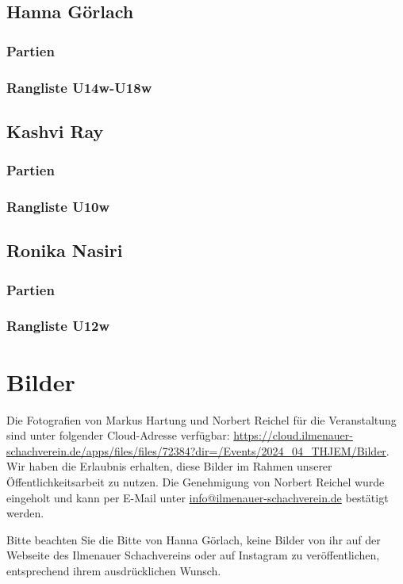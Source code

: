 \documentclass[a4paper,ngerman]{tui-algo-seminar}
\begin{document}
\subsection{Hanna Görlach}
    \subsubsection{Partien}
        
    \subsubsection{Rangliste U14w-U18w}
        
\clearpage

\subsection{Kashvi Ray}
    \subsubsection{Partien}
        
    \subsubsection{Rangliste U10w}
        
\clearpage

\subsection{Ronika Nasiri}
    \subsubsection{Partien}
        
    \subsubsection{Rangliste U12w}
        
    
\clearpage


\section{Bilder}
Die Fotografien von Markus Hartung und Norbert Reichel für die Veranstaltung sind unter folgender Cloud-Adresse verfügbar: \url{https://cloud.ilmenauer-schachverein.de/apps/files/files/72384?dir=/Events/2024_04_THJEM/Bilder}. Wir haben die Erlaubnis erhalten, diese Bilder im Rahmen unserer Öffentlichkeitsarbeit zu nutzen. Die Genehmigung von Norbert Reichel wurde eingeholt und kann per E-Mail unter \href{mailto:info@ilmenauer-schachverein.de}{info@ilmenauer-schachverein.de} bestätigt werden.

Bitte beachten Sie die Bitte von Hanna Görlach, keine Bilder von ihr auf der Webseite des Ilmenauer Schachvereins oder auf Instagram zu veröffentlichen, entsprechend ihrem ausdrücklichen Wunsch. 


\end{document}
